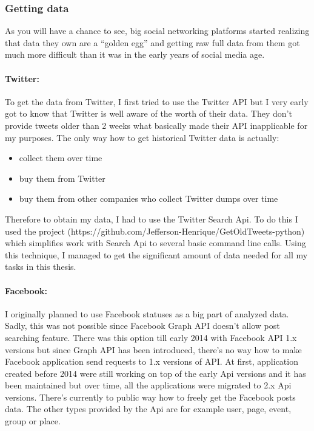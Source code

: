 \subsubsection{Getting data}
As you will have a chance to see, big social networking platforms started realizing that data they own are a “golden egg” and getting raw full data from them got much more difficult than it was in the early years of social media age.

\paragraph{Twitter:}
To get the data from Twitter,  I first tried to use the Twitter API but I very early got to know that Twitter is well aware of the worth of their data. They don't provide tweets older than 2 weeks what basically made their API inapplicable for my purposes. The only way how to get historical Twitter data is actually:

\begin{itemize}
  \item collect them over time
  \item buy them from Twitter
  \item buy them from other companies who collect Twitter dumps over time
\end{itemize}

Therefore to obtain my data, I had to use the Twitter Search Api. To do this I used the project (https://github.com/Jefferson-Henrique/GetOldTweets-python) which simplifies work with Search Api to several basic command line calls. Using this technique, I managed to get the significant amount of data needed for all my tasks in this thesis.

\paragraph{Facebook:}
I originally planned to use Facebook statuses as a big part of analyzed data. Sadly, this was not possible since Facebook Graph API doesn't allow post searching feature. There was this option till early 2014 with Facebook API 1.x versions but since Graph API has been introduced, there's no way how to make Facebook application send requests to 1.x versions of API. At first, application created before 2014 were still working on top of the early Api versions and it has been maintained but over time, all the applications were migrated to 2.x Api versions. There's currently to public way how to freely get the Facebook posts data. The other types provided by the Api are for example user, page, event, group or place.

